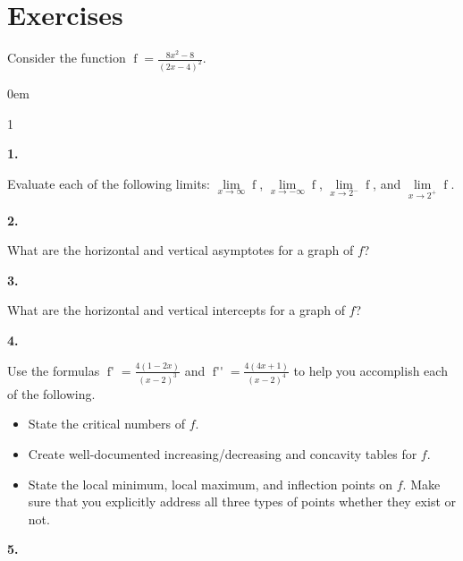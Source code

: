 \documentclass[12pt,]{book}
\theoremstyle{plain}
\theoremstyle{definition}
\numberwithin{equation}{section}
\newenvironment{exercisegroup}%
{\medskip\noindent}%
{\par\bigskip}%
\newlength{\exercisegroupindent}%
\newlength{\exercisegroupitemwidth}%
\newenvironment{exercisegrouplist}%
{\vspace{-\partopsep}%
\begin{adjustwidth}{\exercisegroupindent}{0em}}%
{\end{adjustwidth}%
\vspace{-\partopsep}%
\vspace{\baselineskip}}%
\newenvironment{exercisegroupbycol}[1]%
{\begin{exercisegrouplist}%
\vspace{-\multicolsep}%
\begin{multicols}{#1}%
\setlength{\parindent}{0em}%
\setlength{\exercisegroupitemwidth}{\linewidth}}%
{\end{multicols}%
\vspace{-\multicolsep}%
\end{exercisegrouplist}}%
\newenvironment{exercisegroupitem}[1]%
{\begin{minipage}[t]{\exercisegroupitemwidth}
\vspace{0pt}%
{\bfseries#1}%
\rule{0pt}{\baselineskip}}{\strut%
\end{minipage}%
\hspace{\columnsep}}%
\providecommand\phantomsection{}
\newcommand{\fe}[2]{\mathop{{#1}{\left(#2\right)}}}
\newcommand{\fd}[1]{#1'}
\newcommand{\sd}[1]{#1''}
\begin{document}
\section*{Exercises}\label{exercises-7}

\begin{exercisegroup}%
Consider the function \(\fe{f}{x}=\frac{8x^2-8}{(2x-4)^2}\).%
\par
\begin{exercisegroupbycol}{1}%
\begin{exercisegroupitem}{1. }\phantomsection\hypertarget{exercise-sketch-first-asymptotes}{\null}
Evaluate each of the following limits: \(\lim\limits_{x\to\infty}\fe{f}{x}\), \(\lim\limits_{x\to-\infty}\fe{f}{x}\), \(\lim\limits_{x\to2^{-}}\fe{f}{x}\), and \(\lim\limits_{x\to2^{+}}\fe{f}{x}\).%
\end{exercisegroupitem}%
\par%
\begin{exercisegroupitem}{2. }\phantomsection\hypertarget{exercise-59}{\null}
What are the horizontal and vertical asymptotes for a graph of \(f\)?%
\end{exercisegroupitem}%
\par%
\begin{exercisegroupitem}{3. }\phantomsection\hypertarget{exercise-60}{\null}
What are the horizontal and vertical intercepts for a graph of \(f\)?%
\end{exercisegroupitem}%
\par%
\begin{exercisegroupitem}{4. }\phantomsection\hypertarget{exercise-sketch-first-critical-numbers}{\null}
Use the formulas \(\fe{\fd{f}}{x}=\frac{4(1-2x)}{(x-2)^3}\) and \(\fe{\sd{f}}{x}=\frac{4(4x+1)}{(x-2)^4}\) to help you accomplish each of the following.%
\begin{itemize}[label=\textbullet]
\item{}State the critical numbers of \(f\).\item{}Create well-documented increasing/decreasing and concavity tables for \(f\).\item{}State the local minimum, local maximum, and inflection points on \(f\).  Make sure that you explicitly address all three types of points whether they exist or not.\end{itemize}
\end{exercisegroupitem}%
\par%
\begin{exercisegroupitem}{5. }\phantomsection\hypertarget{exercise-62}{\null}

\end{exercisegroupitem}
\end{exercisegroupbycol}
\end{exercisegroup}
\end{document}
